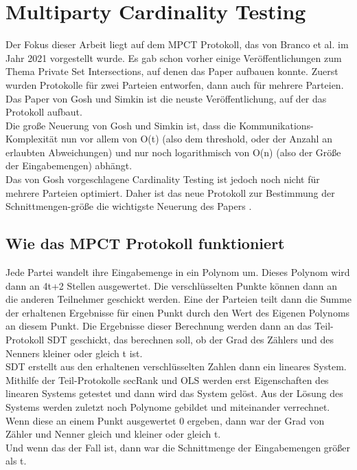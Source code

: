 \chapter{Multiparty Cardinality Testing}

Der Fokus dieser Arbeit liegt auf dem MPCT Protokoll, das von Branco et al. im Jahr 2021 \cite{Doettling2021} vorgestellt wurde. Es gab schon vorher einige Veröffentlichungen zum Thema Private Set Intersections, auf denen das Paper aufbauen konnte. Zuerst wurden Protokolle für zwei Parteien entworfen, dann auch für mehrere Parteien. Das Paper von Gosh und Simkin \cite{Ghosh2019} ist die neuste Veröffentlichung, auf der das Protokoll aufbaut.\\
Die große Neuerung von Gosh und Simkin ist, dass die Kommunikations-Komplexität nun vor allem von O(t) (also dem threshold, oder der Anzahl an \glqq erlaubten Abweichungen\grqq) und nur noch logarithmisch von O(n) (also der Größe der Eingabemengen) abhängt. \cite{Ghosh2019}\\
Das von Gosh vorgeschlagene Cardinality Testing ist jedoch noch nicht  für mehrere Parteien optimiert. Daher ist das neue Protokoll zur Bestimmung der Schnittmengen-größe die wichtigste Neuerung des Papers \cite{Doettling2021}.

\section{Wie das MPCT Protokoll funktioniert}
Jede Partei wandelt ihre Eingabemenge in ein Polynom um. Dieses Polynom wird dann an 4t+2 Stellen ausgewertet. Die verschlüsselten Punkte können dann an die anderen Teilnehmer geschickt werden. Eine der Parteien teilt dann die Summe der erhaltenen Ergebnisse für einen Punkt durch den Wert des Eigenen Polynoms an diesem Punkt.
Die Ergebnisse dieser Berechnung werden dann an das Teil-Protokoll SDT geschickt, das berechnen soll, ob der Grad des Zählers und des Nenners kleiner oder gleich t ist.\\
SDT erstellt aus den erhaltenen verschlüsselten Zahlen dann ein lineares System. Mithilfe der Teil-Protokolle secRank und OLS werden erst Eigenschaften des linearen Systems getestet und dann wird das System gelöst. Aus der Lösung des Systems werden zuletzt noch Polynome gebildet und miteinander verrechnet. Wenn diese an einem Punkt ausgewertet 0 ergeben, dann war der Grad von Zähler und Nenner gleich und kleiner oder gleich t.\\
Und wenn das der Fall ist, dann war die Schnittmenge der Eingabemengen größer als t.\\


